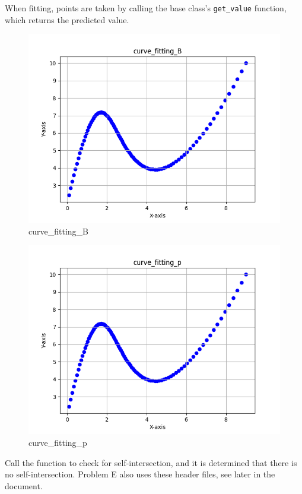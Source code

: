 \documentclass[a4paper]{article}
\begin{document}
When fitting, points are taken by calling the base class's \texttt{get\_value} function, which returns the predicted value.

\begin{figure}[H] 
    \centering
    \includegraphics{../figure/curve_fitting_B.png} 
    \caption{curve\_fitting\_B} 
\end{figure}

\begin{figure}[H] 
    \centering
    \includegraphics{../figure/curve_fitting_p.png} 
    \caption{curve\_fitting\_p} 
\end{figure}

Call the function to check for self-intersection, and it is determined that there is no self-intersection.
Problem E also uses these header files, see later in the document.
\end{document}
